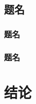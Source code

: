 \subsection{题名}
\subsubsection{题名}
\lipsum
\subsubsection{题名}
\lipsum
\newpage

\section{结论}
\lipsum
\newpage


